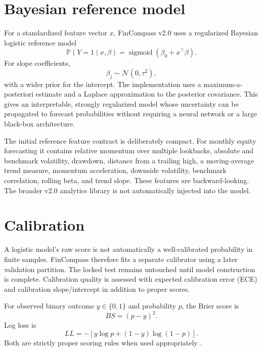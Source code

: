 \documentclass[11pt]{article}
\newcommand{\Prb}{\mathbb{P}}
\newcommand{\sigmoid}{\operatorname{sigmoid}}
\begin{document}
\section{Bayesian reference model}
For a standardized feature vector $x$, FinCompass v2.0 uses a regularized Bayesian logistic reference model
\begin{equation}
\Prb(Y=1\mid x,\beta)=\sigmoid(\beta_0+x^\top\beta).
\end{equation}
For slope coefficients,
\begin{equation}
\beta_j\sim\mathcal{N}(0,\tau^2),
\end{equation}
with a wider prior for the intercept. The implementation uses a maximum-a-posteriori estimate and a Laplace approximation to the posterior covariance. This gives an interpretable, strongly regularized model whose uncertainty can be propagated to forecast probabilities without requiring a neural network or a large black-box architecture.

The initial reference feature contract is deliberately compact. For monthly equity forecasting it contains relative momentum over multiple lookbacks, absolute and benchmark volatility, drawdown, distance from a trailing high, a moving-average trend measure, momentum acceleration, downside volatility, benchmark correlation, rolling beta, and trend slope. These features are backward-looking. The broader v2.0 analytics library is not automatically injected into the model.

\section{Calibration}
A logistic model's raw score is not automatically a well-calibrated probability in finite samples. FinCompass therefore fits a separate calibrator using a later validation partition. The locked test remains untouched until model construction is complete. Calibration quality is assessed with expected calibration error (ECE) and calibration slope/intercept in addition to proper scores.

For observed binary outcome $y\in\{0,1\}$ and probability $p$, the Brier score is \citep{brier1950verification}
\begin{equation}
BS=(p-y)^2.
\end{equation}
Log loss is
\begin{equation}
LL=-[y\log p+(1-y)\log(1-p)].
\end{equation}
Both are strictly proper scoring rules when used appropriately \citep{gneiting2007proper}.
\end{document}
